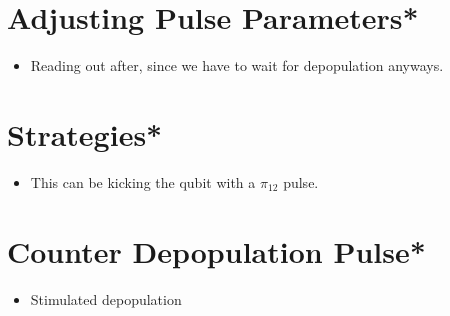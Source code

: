 \section{Adjusting Pulse Parameters*}
\begin{itemize}
    \item Reading out after, since we have to wait for depopulation anyways.
\end{itemize}

\section{Strategies*}
\begin{itemize}
    \item This can be kicking the qubit with a $\pi_{12}$ pulse. 
\end{itemize}

\section{Counter Depopulation Pulse*}
\begin{itemize}
    \item Stimulated depopulation
\end{itemize}